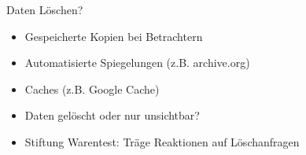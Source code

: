 \begin{frame}{Daten Löschen?}
	\begin{itemize}
		\item Gespeicherte Kopien bei Betrachtern
		\item Automatisierte Spiegelungen (z.B. archive.org)
		\item Caches (z.B. Google Cache)
		\item Daten gelöscht oder nur unsichtbar?
		\item Stiftung Warentest: Träge Reaktionen auf Löschanfragen%
	\end{itemize}
\end{frame}

